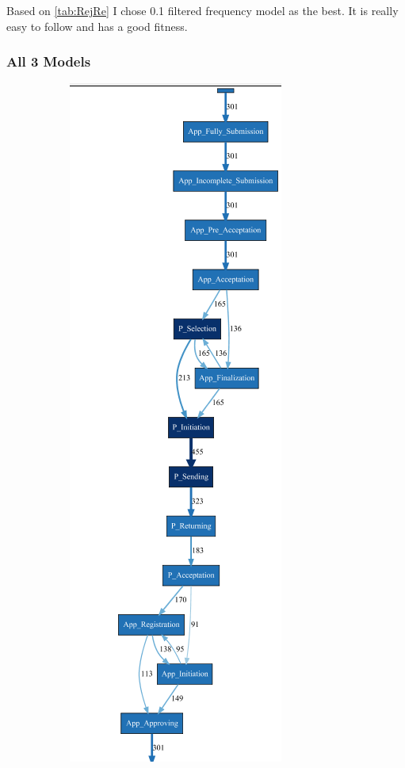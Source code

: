 Based on \ref{tab:RejRe} I chose 0.1 filtered frequency model as the best. It is really easy to follow and has a good fitness.



\subsubsection{All 3 Models}
\begin{figure}[!htbp]
\centering
\begin{subfigure}{.3\textwidth}
\includegraphics[height=0.3\textheight]{APP_ApprovedDFG0-3.PNG}  

\end{subfigure}
\end{figure}
